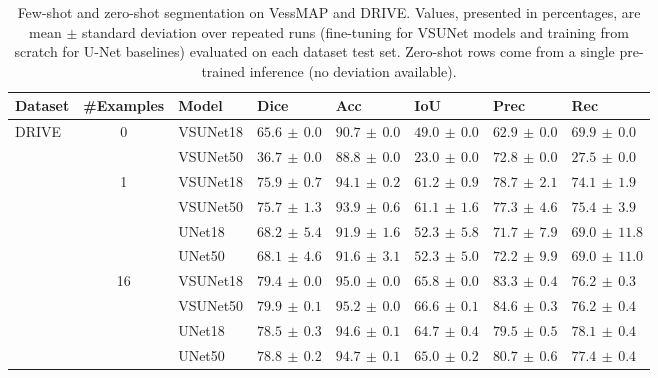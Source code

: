 \documentclass[%
reprint,
nofootinbib,
 amsmath,amssymb,
aps,
superscriptaddress,
showkeys,
longbibliography
]{revtex4-1}
\begin{document}
\begin{table}[t]
    \caption{Few-shot and zero-shot segmentation on VessMAP and DRIVE. Values, presented in percentages, are mean $\pm$ standard deviation over repeated runs (fine-tuning for VSUNet models and training from scratch for U-Net baselines) evaluated on each dataset test set. Zero-shot rows come from a single pre-trained inference (no deviation available).}
    \label{tab:combined_fewshot_percent}
    \centering
    \begingroup
    \small
    \setlength{\tabcolsep}{4pt}
    \renewcommand{\arraystretch}{1.15}
    \begin{tabular}{l c l l l l l l}
        \hline
        \textbf{Dataset} & \textbf{\#Examples} & \textbf{Model} & \textbf{Dice} & \textbf{Acc} & \textbf{IoU} & \textbf{Prec} & \textbf{Rec} \\
        \hline
        \multirow{10}{*}{DRIVE} & \multirow{2}{*}{0} & VSUNet18 & $65.6 \,\pm\, 0.0$ & $90.7 \,\pm\, 0.0$ & $49.0 \,\pm\, 0.0$ & $62.9 \,\pm\, 0.0$ & $69.9 \,\pm\, 0.0$ \\
         &  & VSUNet50 & $36.7 \,\pm\, 0.0$ & $88.8 \,\pm\, 0.0$ & $23.0 \,\pm\, 0.0$ & $72.8 \,\pm\, 0.0$ & $27.5 \,\pm\, 0.0$ \\
         \cline{2-8}
         & \multirow{4}{*}{1} & VSUNet18 & $75.9 \,\pm\, 0.7$ & $94.1 \,\pm\, 0.2$ & $61.2 \,\pm\, 0.9$ & $78.7 \,\pm\, 2.1$ & $74.1 \,\pm\, 1.9$ \\
         &  & VSUNet50 & $75.7 \,\pm\, 1.3$ & $93.9 \,\pm\, 0.6$ & $61.1 \,\pm\, 1.6$ & $77.3 \,\pm\, 4.6$ & $75.4 \,\pm\, 3.9$ \\
         &  & UNet18 & $68.2 \,\pm\, 5.4$ & $91.9 \,\pm\, 1.6$ & $52.3 \,\pm\, 5.8$ & $71.7 \,\pm\, 7.9$ & $69.0 \,\pm\, 11.8$ \\
         &  & UNet50 & $68.1 \,\pm\, 4.6$ & $91.6 \,\pm\, 3.1$ & $52.3 \,\pm\, 5.0$ & $72.2 \,\pm\, 9.9$ & $69.0 \,\pm\, 11.0$ \\
         \cline{2-8}
         & \multirow{4}{*}{16} & VSUNet18 & $79.4 \,\pm\, 0.0$ & $95.0 \,\pm\, 0.0$ & $65.8 \,\pm\, 0.0$ & $83.3 \,\pm\, 0.4$ & $76.2 \,\pm\, 0.3$ \\
         &  & VSUNet50 & $79.9 \,\pm\, 0.1$ & $95.2 \,\pm\, 0.0$ & $66.6 \,\pm\, 0.1$ & $84.6 \,\pm\, 0.3$ & $76.2 \,\pm\, 0.4$ \\
         &  & UNet18 & $78.5 \,\pm\, 0.3$ & $94.6 \,\pm\, 0.1$ & $64.7 \,\pm\, 0.4$ & $79.5 \,\pm\, 0.5$ & $78.1 \,\pm\, 0.4$ \\
         &  & UNet50 & $78.8 \,\pm\, 0.2$ & $94.7 \,\pm\, 0.1$ & $65.0 \,\pm\, 0.2$ & $80.7 \,\pm\, 0.6$ & $77.4 \,\pm\, 0.4$ \\

\end{tabular}
\end{table}
\end{document}
